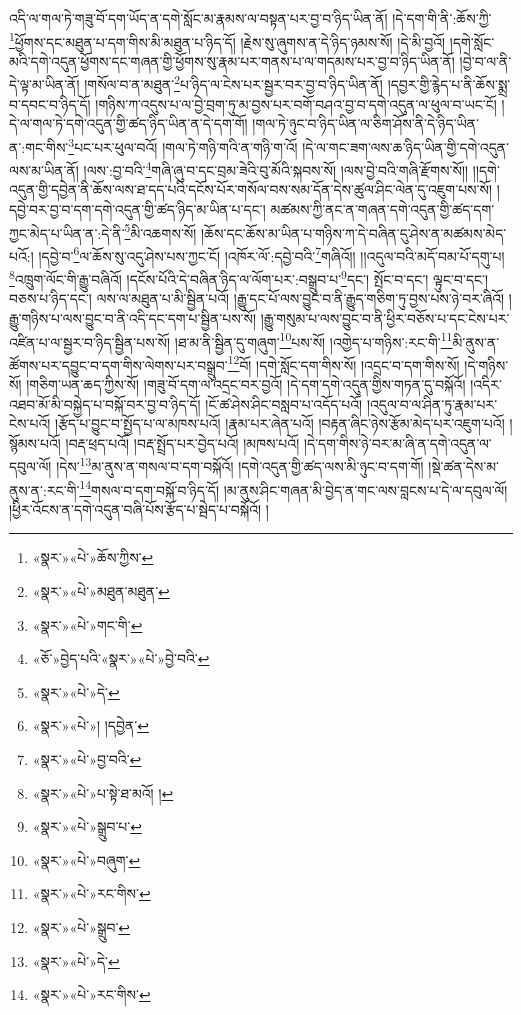 འདི་ལ་གལ་ཏེ་གཟུ་བོ་དག་ཡོད་ན་དགེ་སློང་མ་རྣམས་ལ་བསྟན་པར་བྱ་བ་ཉིད་ཡིན་ནོ། །དེ་དག་གི་ནི་:ཆོས་ཀྱི་\footnote{«སྣར་»«པེ་»ཆོས་ཀྱིས་}ཕྱོགས་དང་མཐུན་པ་དག་གིས་མི་མཐུན་པ་ཉིད་དོ། །རྗེས་སུ་ཞུགས་ན་དེ་ཉིད་ཉམས་སོ། །དེ་མི་བྱའོ། །དགེ་སློང་མའི་དགེ་འདུན་ཕྱོགས་དང་གཞན་གྱི་ཕྱོགས་སུ་རྣམ་པར་གནས་པ་ལ་གདམས་པར་བྱ་བ་ཉིད་ཡིན་ནོ། །བྱེ་བ་ལ་ནི་དེ་ལྟ་མ་ཡིན་ནོ། །གསོལ་བ་ན་མཐུན་\footnote{«སྣར་»«པེ་»མཐུན་མཐུན་}པ་ཉིད་ལ་ངེས་པར་སྦྱར་བར་བྱ་བ་ཉིད་ཡིན་ནོ། །དབྱར་གྱི་རྙེད་པ་ནི་ཆོས་སྨྲ་བ་དབང་བ་ཉིད་དོ། །གཉིས་ཀ་འདུས་པ་ལ་བྱེ་བྲག་ཏུ་མ་བྱས་པར་བགོ་བཤའ་བྱ་བ་དགེ་འདུན་ལ་ཕུལ་བ་ཡང་ངོ། །དེ་ལ་གལ་ཏེ་དགེ་འདུན་གྱི་ཚད་ཉིད་ཡིན་ན་དེ་དག་གོ། །གལ་ཏེ་ཉུང་བ་ཉིད་ཡིན་ལ་ཅིག་ཤོས་ནི་དེ་ཉིད་ཡིན་ན་:གང་གིས་\footnote{«སྣར་»«པེ་»གང་གི་}པང་པར་ཕུལ་བའོ། །གལ་ཏེ་གཉི་གའི་ན་གཉི་ག་འོ། །དེ་ལ་གང་ཟག་ལས་ཆ་ཉིད་ཡིན་གྱི་དགེ་འདུན་ལས་མ་ཡིན་ནོ། །ལས་:བྱ་བའི་\footnote{«ཅོ་»བྱེད་པའི་«སྣར་»«པེ་»བྱེ་བའི་}གཞི་ཞུ་བ་དང་བྲམ་ཟེའི་བུ་མོའི་སྐབས་སོ། །ལས་བྱེ་བའི་གཞི་རྫོགས་སོ།། །།དགེ་འདུན་གྱི་དབྱེན་ནི་ཆོས་ལས་ཐ་དད་པའི་དངོས་པོར་གསོལ་བས་སམ་དོན་དེས་ཚུལ་ཤིང་ལེན་དུ་འཇུག་པས་སོ། །དབྱེ་བར་བྱ་བ་དག་དགེ་འདུན་གྱི་ཚད་ཉིད་མ་ཡིན་པ་དང་། མཚམས་ཀྱི་ནང་ན་གཞན་དགེ་འདུན་གྱི་ཚད་དག་ཀྱང་མེད་པ་ཡིན་ན་:དེ་ནི་\footnote{«སྣར་»«པེ་»དེ་}མི་འཆགས་སོ། །ཆོས་དང་ཆོས་མ་ཡིན་པ་གཉིས་ཀ་དེ་བཞིན་དུ་ཤེས་ན་མཚམས་མེད་པའོ:། །དབྱེ་བ་\footnote{«སྣར་»«པེ་»། །དབྱེན་}ལ་ཆོས་སུ་འདུ་ཤེས་པས་ཀྱང་ངོ། །འཁོར་ལོ་:དབྱེ་བའི་\footnote{«སྣར་»«པེ་»བྱ་བའི་}གཞིའོ།། །།འདུལ་བའི་མདོ་བམ་པོ་དགུ་པ། \footnote{«སྣར་»«པེ་»པ་སྟེ་ཐ་མའོ། ། }འཁྲུག་ལོང་གི་རྒྱུ་བཞིའོ། །དངོས་པོའི་དེ་བཞིན་ཉིད་ལ་ལོག་པར་:བསྒྲུབ་པ་\footnote{«སྣར་»«པེ་»སྒྲུབ་པ་}དང་། སྤོང་བ་དང་། ལྟུང་བ་དང་། བཅས་པ་ཉིད་དང་། ལས་ལ་མཐུན་པ་མི་སྦྱིན་པའོ། །རྒྱུ་དང་པོ་ལས་བྱུང་བ་ནི་རྒྱུད་གཅིག་ཏུ་བྱས་པས་ཉེ་བར་ཞིའོ། །རྒྱུ་གཉིས་པ་ལས་བྱུང་བ་ནི་འདི་དང་དག་པ་སྦྱིན་པས་སོ། །རྒྱུ་གསུམ་པ་ལས་བྱུང་བ་ནི་ཕྱིར་བཅོས་པ་དང་ངེས་པར་འཛིན་པ་ལ་སྦྱར་བ་ཉིད་སྦྱིན་པས་སོ། །ཐ་མ་ནི་སྦྱིན་དུ་གཞུག་\footnote{«སྣར་»«པེ་»བཞུག་}པས་སོ། །འགྱེད་པ་གཉིས་:རང་གི་\footnote{«སྣར་»«པེ་»རང་གིས་}མི་ནུས་ན་ཚོགས་པར་དབྱུང་བ་དག་གིས་ལེགས་པར་བསྒྲུབ་\footnote{«སྣར་»«པེ་»སྒྲུབ་}བོ། །དགེ་སློང་དག་གིས་སོ། །འདྲང་བ་དག་གིས་སོ། །དེ་གཉིས་སོ། །གཅིག་ཡན་ཆད་ཀྱིས་སོ། །གཟུ་བོ་དག་ལ་འདྲང་བར་བྱའོ། །དེ་དག་དགེ་འདུན་གྱིས་གཏན་དུ་བསྐོའོ། །འདིར་འཐབ་མོ་མི་བསྐྱེད་པ་བསྐོ་བར་བྱ་བ་ཉིད་དོ། །ངོ་ཚ་ཤེས་ཤིང་བསླབ་པ་འདོད་པའོ། །འདུལ་བ་ལ་ཤིན་ཏུ་རྣམ་པར་ངེས་པའོ། །རྩོད་པ་བྱུང་བ་སྤྱོད་པ་ལ་མཁས་པའོ། །རྣམ་པར་ཞེན་པའོ། །བརྟན་ཞིང་ཉེས་རྩོམ་མེད་པར་འཇུག་པའོ། །སྙོམས་པའོ། །བརྡ་ཕྲད་པའོ། །བརྡ་སྤྲོད་པར་བྱེད་པའོ། །མཁས་པའོ། །དེ་དག་གིས་ཉེ་བར་མ་ཞི་ན་དགེ་འདུན་ལ་དབུལ་ལོ། །དེས་\footnote{«སྣར་»«པེ་»དེ་}མ་ནུས་ན་གསལ་བ་དག་བསྐོའོ། །དགེ་འདུན་གྱི་ཚད་ལས་མི་ཉུང་བ་དག་གོ། །སྡེ་ཚན་དེས་མ་ནུས་ན་:རང་གི་\footnote{«སྣར་»«པེ་»རང་གིས་}གསལ་བ་དག་བསྐོ་བ་ཉིད་དོ། །མ་ནུས་ཤིང་གཞན་མི་བྱེད་ན་གང་ལས་བླངས་པ་དེ་ལ་དབུལ་ལོ། །ཕྱིར་འོངས་ན་དགེ་འདུན་བཞི་པོས་རྩོད་པ་སྦེད་པ་བསྐོའོ། །
